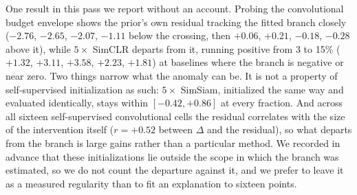 One result in this pass we report without an account. Probing the
convolutional budget envelope shows the prior's own residual tracking the
fitted branch closely ($-2.76$, $-2.65$, $-2.07$, $-1.11$ below the
crossing, then $+0.06$, $+0.21$, $-0.18$, $-0.28$ above it), while
$5\times$ SimCLR departs from it, running positive from 3 to 15\%
($+1.32$, $+3.11$, $+3.58$, $+2.23$, $+1.81$) at baselines where the branch
is negative or near zero. Two things narrow what the anomaly can be. It is
not a property of self-supervised initialization as such: $5\times$
SimSiam, initialized the same way and evaluated identically, stays within
$[-0.42, +0.86]$ at every fraction. And across all sixteen self-supervised
convolutional cells the residual correlates with the size of the
intervention itself ($r = +0.52$ between $\Delta$ and the residual), so
what departs from the branch is large gains rather than a particular
method. We recorded in advance that these initializations lie outside the
scope in which the branch was estimated, so we do not count the departure
against it, and we prefer to leave it as a measured regularity than to fit
an explanation to sixteen points.
